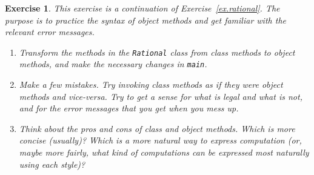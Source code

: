 \documentclass[12pt]{book}
\theoremstyle{exercise}
\newtheorem{exercise}{Exercise}[chapter]
\newcommand{\java}[1]{\lstinline{#1}} %
\begin{document}
\begin{exercise}

This exercise is a continuation of Exercise~\ref{ex.rational}.
The purpose is to practice the syntax of object methods and get familiar with the relevant error messages.

\begin{enumerate}

\item Transform the methods in the \java{Rational} class from class methods to object methods, and make the necessary changes in \java{main}.

\item Make a few mistakes.
Try invoking class methods as if they were object methods and vice-versa.
Try to get a sense for what is legal and what is not, and for the error messages that you get when you mess up.

\item Think about the pros and cons of class and object methods.
Which is more concise (usually)?
Which is a more natural way to express computation (or, maybe more fairly, what kind of computations can be expressed most naturally using each style)?

\end{enumerate}
\end{exercise}
\end{document}
